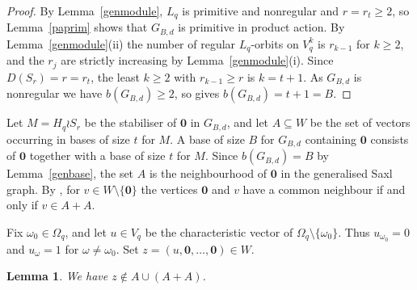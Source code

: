 \documentclass[a4paper,reqno,11pt]{amsart}
\newtheorem{lem}[thm]{Lemma}
\numberwithin{equation}{section}
\begin{document}
\begin{proof}
By Lemma~\ref{genmodule}, $L_q$ is primitive and nonregular and $r=r_t\ge2$, so Lemma~\ref{paprim} shows that $G_{B,d}$ is primitive in product action. By Lemma~\ref{genmodule}(ii) the number of regular $L_q$-orbits on $V_q^{k}$ is $r_{k-1}$ for $k\ge2$, and the $r_j$ are strictly increasing by Lemma~\ref{genmodule}(i). Since $D(S_r)=r=r_t$, the least $k\ge2$ with $r_{k-1}\ge r$ is $k=t+1$. As $G_{B,d}$ is nonregular we have $b(G_{B,d})\ge2$, so \cite[Theorem~6.1]{FHLR} gives $b(G_{B,d})=t+1=B$.
\end{proof}

Let $M=H_q\wr S_r$ be the stabiliser of $\mathbf0$ in $G_{B,d}$, and let $A\subseteq W$ be the set of vectors occurring in bases of size $t$ for $M$. A base of size $B$ for $G_{B,d}$ containing $\mathbf0$ consists of $\mathbf0$ together with a base of size $t$ for $M$. Since $b(G_{B,d})=B$ by Lemma~\ref{genbase}, the set $A$ is the neighbourhood of $\mathbf0$ in the generalised Saxl graph. By \cite[Lemma~5.1]{FHLR}, for $v\in W\setminus\{\mathbf0\}$ the vertices $\mathbf0$ and $v$ have a common neighbour if and only if $v\in A+A$.

Fix $\omega_0\in\Omega_q$, and let $u\in V_q$ be the characteristic vector of $\Omega_q\setminus\{\omega_0\}$. Thus $u_{\omega_0}=0$ and $u_\omega=1$ for $\omega\ne\omega_0$. Set $z=(u,\mathbf0,\dots,\mathbf0)\in W$.

\begin{lem}\label{genobstruction}
We have $z\notin A\cup(A+A)$.
\end{lem}
\end{document}
